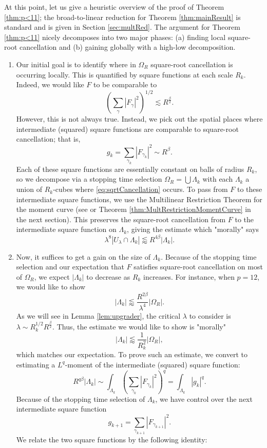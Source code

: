 \documentclass[12pt]{amsart}
\begin{document}
At this point, let us give a heuristic overview of the proof of Theorem \ref{thm:p<11}; the broad-to-linear reduction for Theorem \ref{thm:mainResult} is standard and is given in Section \ref{sec:multRed}. The argument for Theorem \ref{thm:p<11} nicely decomposes into two major phases: (a) finding local square-root cancellation and (b) gaining globally with a high-low decomposition. \begin{enumerate}
    \item[Phase (a):] Our initial goal is to identify where in $\Omega_R$ square-root cancellation is occurring locally. This is quantified by square functions at each scale $R_k$. Indeed, we would like $F$ to be comparable to $$\left(\sum_{\gamma}|F_\gamma|^2\right)^{1/2}\lesssim R^{\frac{\beta}{2}}.$$ However, this is not always true. Instead, we pick out the spatial places where intermediate (squared) square functions are comparable to square-root cancellation; that is, \begin{equation}\label{eq:sqrtCancellation}
        g_k=\sum_{\gamma_k} |F_{\gamma_k}|^2 \sim R^{\beta}.
    \end{equation} Each of these square functions are essentially constant on balls of radius $R_k$, so we decompose via a stopping time selection $\Omega_R=\bigcup \Lambda_k$ with each $\Lambda_k$ a union of $R_k$-cubes where \eqref{eq:sqrtCancellation} occurs. To pass from $F$ to these intermediate square functions, we use the Multilinear Restriction Theorem for the moment curve (see \cite[Ex. 6.33]{demeter2020fourier} or Theorem \ref{thm:MultRestrictionMomentCurve} in the next section). This preserves the square-root cancellation from $F$ to the intermediate square function on $\Lambda_k$, giving the estimate which "morally" says $$\lambda^8|U_{\lambda}\cap \Lambda_k|\lessapprox R^{4\beta}|\Lambda_k|.$$

    \item[Phase (b):] Now, it suffices to get a gain on the size of $\Lambda_k$. Because of the stopping time selection and our expectation that $F$ satisfies square-root cancellation on most of $\Omega_R$, we expect $|\Lambda_k|$ to decrease as $R_k$ increases. For instance, when $p=12$, we would like to show $$|\Lambda_k|\lessapprox \frac{R^{2\beta}}{\lambda^4}|\Omega_R|.$$ As we will see in Lemma \ref{lem:upgrader}, the critical $\lambda$ to consider is $\lambda\sim R_k^{1/2}R^{\frac{\beta}{2}}.$ Thus, the estimate we would like to show is "morally" $$|\Lambda_k|\lessapprox \frac{1}{R_k^2}|\Omega_R|,$$ which matches our expectation. To prove such an estimate, we convert to estimating a $L^q$-moment of the intermediate (squared) square function: $$R^{q\beta}|\Lambda_k|\sim \int_{\Lambda_k}\left(\sum_{\gamma_k}|F_{\gamma_k}|^2\right)^{q} = \int_{\Lambda_k}|g_k|^q.$$ Because of the stopping time selection of $\Lambda_k$, we have control over the next intermediate square function $$g_{k+1}=\sum_{\gamma_{k+1}}|F_{\gamma_{k+1}}|^2.$$ We relate the two square functions by the following identity:


\end{enumerate}
\end{document}
